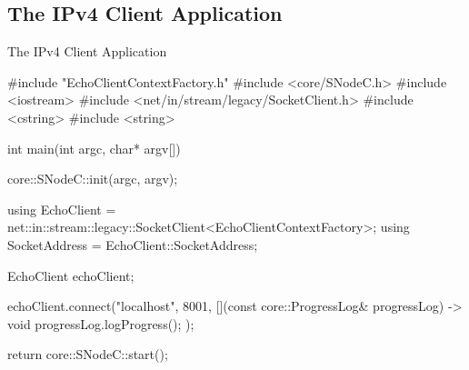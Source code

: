 ﻿\subsection{The IPv4 Client Application}

\begin{frame}[fragile]{The IPv4 Client Application}
  \begin{cppcode}[autogobble=true, caption={IPv4 client application.},captionpos=b]
    #include "EchoClientContextFactory.h"
    #include <core/SNodeC.h>
    #include <iostream>
    #include <net/in/stream/legacy/SocketClient.h>
    #include <cstring>
    #include <string>

    int main(int argc, char* argv[]) {
      core::SNodeC::init(argc, argv);

      using EchoClient = net::in::stream::legacy::SocketClient<EchoClientContextFactory>;
      using SocketAddress = EchoClient::SocketAddress;

      EchoClient echoClient;

      echoClient.connect("localhost", 8001, [](const core::ProgressLog& progressLog) -> void {
        progressLog.logProgress();
      });

      return core::SNodeC::start();
    }
  \end{cppcode}
\end{frame}
